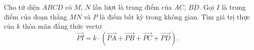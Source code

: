 \begin{ex}
Cho tứ diện $ABCD$ có $M$, $N$ lần lượt là trung điểm của $AC$, $BD$. Gọi $I$ là trung điểm của đoạn thẳng $MN$ và $P$ là điểm bất kỳ trong không gian. Tìm giá trị thực của $k$ thỏa mãn đẳng thức vectơ
\[\overrightarrow{PI}=k\cdot\left(\overrightarrow{PA}+\overrightarrow{PB}+\overrightarrow{PC}+\overrightarrow{PD}\right).\]
\end{ex}
